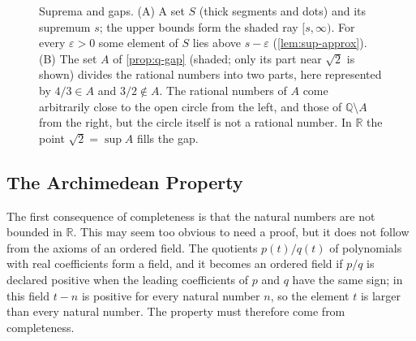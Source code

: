 \begin{figure}
\sdpanelrow
{}
\caption{Suprema and gaps. (A) A set $S$ (thick segments and dots) and its supremum $s$; the upper bounds form the shaded ray $[s,\infty)$. For every $\varepsilon>0$ some element of $S$ lies above $s-\varepsilon$ (\cref{lem:sup-approx}). (B) The set $A$ of \cref{prop:q-gap} (shaded; only its part near $\sqrt2$ is shown) divides the rational numbers into two parts, here represented by $4/3\in A$ and $3/2\notin A$. The rational numbers of $A$ come arbitrarily close to the open circle from the left, and those of $\mathbb Q\setminus A$ from the right, but the circle itself is not a rational number. In $\mathbb R$ the point $\sqrt2=\sup A$ fills the gap.}
\label{fig:sup-cut}
\end{figure}

\subsection{The Archimedean Property}

The first consequence of completeness is that the natural numbers are not bounded in $\mathbb R$. This may seem too obvious to need a proof, but it does not follow from the axioms of an ordered field. The quotients $p(t)/q(t)$ of polynomials with real coefficients form a field, and it becomes an ordered field if $p/q$ is declared positive when the leading coefficients of $p$ and $q$ have the same sign; in this field $t-n$ is positive for every natural number $n$, so the element $t$ is larger than every natural number. The property must therefore come from completeness.

